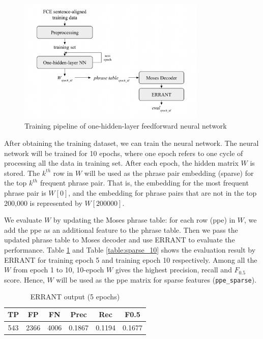 \documentclass[12pt,a4paper,twoside,openright]{report}
\begin{document}
\begin{figure}[ht]
\centering
\includegraphics[width=0.8\textwidth]{images/sparse_pipeline.png}
\caption{Training pipeline of one-hidden-layer feedforward neural network}
\label{fig:sparse_pipeline}
\end{figure}


After obtaining the training dataset, we can train the neural network. The neural network will be trained for 10 epochs, where one epoch refers to one cycle of processing all the data in training set. After each epoch, the hidden matrix $W$ is stored. The $k^{th}$ row in $W$ will be used as the phrase pair embedding (sparse) for the top $k^{th}$ frequent phrase pair. That is, the embedding for the most frequent phrase pair is $W[0]$, and the embedding for phrase pairs that are not in the top 200,000 is represented by $W[200000]$.

We evaluate $W$ by updating the Moses phrase table: for each row (ppe) in $W$, we add the ppe as an additional feature to the phrase table. Then we pass the updated phrase table to Moses decoder and use ERRANT to evaluate the performance. Table \ref{table:sparse_5} and Table \ref{table:sparse_10} shows the evaluation result by ERRANT for training epoch 5 and training epoch 10 respectively. Among all the $W$ from epoch 1 to 10, 10-epoch $W$ gives the highest precision, recall and $F_{0.5}$ score. Hence, $W$ will be used as the ppe matrix for sparse features (\texttt{ppe\_sparse}).

\begin{table}[h!]
\centering
\begin{tabular}{ |c|c|c|c|c|c| } 
 \hline
 TP & FP & FN & Prec & Rec & F0.5 \\ [0.5ex] 
 \hline
 543 & 2366 & 4006 & 0.1867 & 0.1194 & 0.1677 \\ 
 \hline
\end{tabular}
\caption{ERRANT output (5 epochs)}
\label{table:sparse_5}
\end{table}
\end{document}
